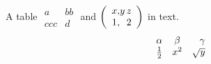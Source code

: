 \documentclass{article}
\begin{document}
A table $\begin{array}{|l||r|} a & bb \\ ccc & d \end{array}$ and $\left(\begin{array}{c@{,}c@{\,}r} x & y & z \\ 1 & & 2 \end{array}\right)$ in text.
\[ \begin{array}{@{}lcr@{}} \alpha & \beta & \gamma \\ \frac{1}{2} & x^2 & \sqrt{y} \end{array} \]
\end{document}
